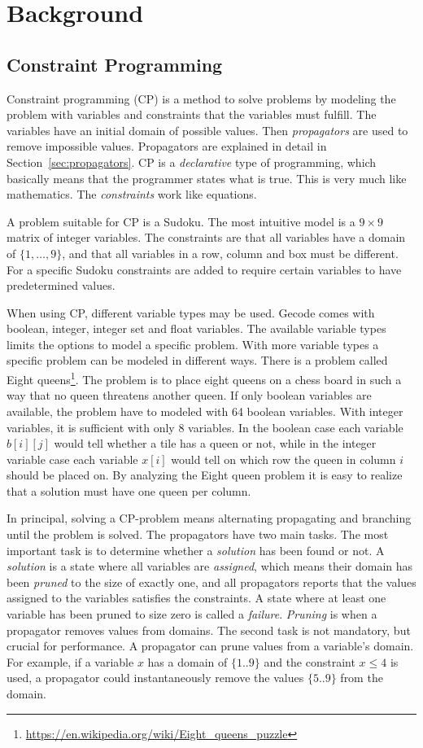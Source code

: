 \documentclass[a4paper,11pt]{article}
\begin{document}
\section{Background}
\subsection{Constraint Programming}

Constraint programming (CP) is a method to solve problems by modeling the problem with variables and constraints that the variables must fulfill. The variables have an initial domain of possible values. Then \textit{propagators} are used to remove impossible values. Propagators are explained in detail in Section~\ref{sec:propagators}. CP is a \textit{declarative} type of programming, which basically means that the programmer states what is true. This is very much like mathematics. The \textit{constraints} work like equations.

A problem suitable for CP is a Sudoku. The most intuitive model is a $9\times9$ matrix of integer variables. The constraints are that all variables have a domain of $\{1,\ldots,9\}$, and that all variables in a row, column and box must be different. For a specific Sudoku constraints are added to require certain variables to have predetermined values.

When using CP, different variable types may be used. Gecode comes with boolean, integer, integer set and float variables. The available variable types limits the options to model a specific problem. With more variable types a specific problem can be modeled in different ways. There is a problem called Eight queens\footnote{\url{https://en.wikipedia.org/wiki/Eight_queens_puzzle}}. The problem is to place eight queens on a chess board in such a way that no queen threatens another queen. If only boolean variables are available, the problem have to modeled with 64 boolean variables. With integer variables, it is sufficient with only 8 variables. In the boolean case each variable $b[i][j]$ would tell whether a tile has a queen or not, while in the integer variable case each variable $x[i]$ would tell on which row the queen in column $i$ should be placed on. By analyzing the Eight queen problem it is easy to realize that a solution must have one queen per column.

In principal, solving a CP-problem means alternating propagating and branching until the problem is solved. The propagators have two main tasks. The most important task is to determine whether a \textit{solution} has been found or not. A \textit{solution} is a state where all variables are \textit{assigned}, which means their domain has been \textit{pruned} to the size of exactly one, and all propagators reports that the values assigned to the variables satisfies the constraints. A state where at least one variable has been pruned to size zero is called a \textit{failure}. \textit{Pruning} is when a propagator removes values from domains. The second task is not mandatory, but crucial for performance. A propagator can prune values from a variable's domain. For example, if a variable $x$ has a domain of $\{1..9\}$ and the constraint $x\le 4$ is used, a propagator could instantaneously remove the values $\{5..9\}$ from the domain.
\end{document}
